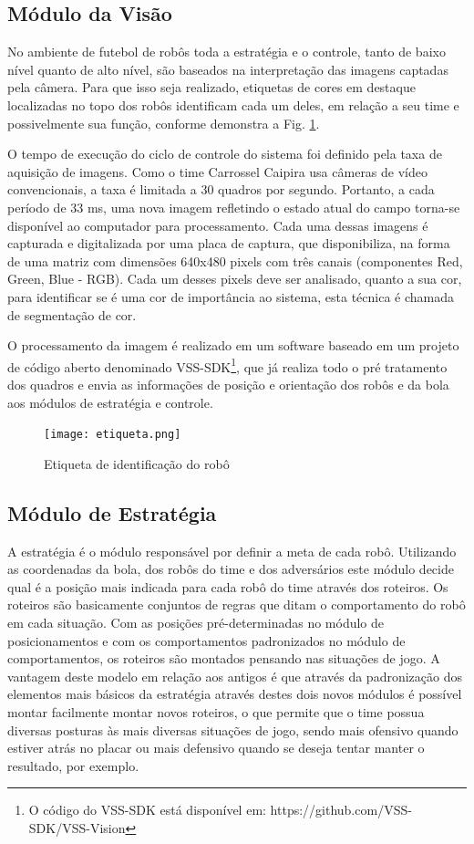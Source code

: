 \subsection{Módulo da Visão}

No ambiente de futebol de robôs toda a estratégia e o controle, tanto de baixo nível quanto de alto nível, são baseados na interpretação das imagens captadas pela câmera. Para que isso seja realizado, etiquetas de cores em destaque localizadas no topo dos robôs identificam cada um deles, em relação a seu time e possivelmente sua função, conforme demonstra a Fig. \ref{fig:etiqueta}.

O tempo de execução do ciclo de controle do sistema foi definido pela taxa de aquisição de imagens. Como o time Carrossel Caipira usa câmeras de vídeo convencionais, a taxa é limitada a 30 quadros por segundo. Portanto, a cada período de 33 ms, uma nova imagem refletindo o estado atual do campo torna-se disponível ao computador para processamento. Cada uma dessas imagens é capturada e digitalizada por uma placa
de captura, que disponibiliza, na forma de uma matriz com dimensões 640x480 pixels com três canais (componentes Red, Green, Blue - RGB). Cada um desses pixels deve ser analisado, quanto a sua cor, para identificar se é uma cor de importância ao sistema, esta técnica é chamada de segmentação de cor.

O processamento da imagem é realizado em um software baseado em um projeto de código aberto denominado VSS-SDK\footnote{O código do VSS-SDK está disponível em: https://github.com/VSS-SDK/VSS-Vision}, que já realiza todo o pré tratamento dos quadros e envia as informações de posição e orientação dos robôs e da bola aos módulos de estratégia e controle.

\begin{figure}[!htb]
    \centering
        \texttt{[image: etiqueta.png]}
        \caption{ Etiqueta de identificação do robô}
    \label{fig:etiqueta}
\end{figure}

\subsection{Módulo de Estratégia}

A estratégia é o módulo responsável por definir a meta de cada robô. Utilizando as coordenadas da bola, dos robôs do time e dos adversários este módulo decide qual é a posição mais indicada para cada robô do time através dos roteiros. Os roteiros são basicamente conjuntos de regras que ditam o comportamento do robô em cada situação. Com as posições pré-determinadas no módulo de posicionamentos e com os comportamentos padronizados no módulo de comportamentos, os roteiros são montados pensando nas situações de jogo. A vantagem deste modelo em relação aos antigos é que através da padronização dos elementos mais básicos da estratégia através destes dois novos módulos é possível montar facilmente montar novos roteiros, o que permite que o time possua diversas posturas às mais diversas situações de jogo, sendo mais ofensivo quando estiver atrás no placar ou mais defensivo quando se deseja tentar manter o resultado, por exemplo.

